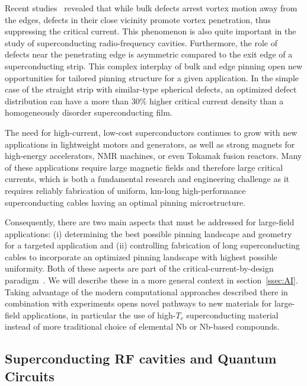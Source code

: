 \documentclass[%
 aip,
 amsmath,amssymb,
 reprint,%
floatfix]{revtex4-1}
\newcommand{\Tc}{T_{c}}
\begin{document}
Recent studies~\cite{kimmel2019} revealed that while bulk defects arrest vortex motion away from the edges, defects in their close vicinity promote vortex penetration, thus suppressing the critical current. This phenomenon is also quite important in the study of superconducting radio-frequency cavities. Furthermore, the role of defects near the penetrating edge is asymmetric compared to the exit edge of a superconducting strip. This complex interplay of bulk and edge pinning open new opportunities for tailored pinning structure for a given application.
In the simple case of the straight strip with similar-type spherical defects, an optimized defect distribution can have a more than 30\% higher critical current density than a homogeneously disorder superconducting film.

The need for high-current, low-cost superconductors continues to grow with new applications in lightweight motors and generators, as well as strong magnets for high-energy accelerators, NMR machines, or even Tokamak fusion reactors. Many of these applications require large magnetic fields and therefore large critical currents, which is both a fundamental research and engineering challenge as it requires reliably fabrication of uniform, km-long high-performance superconducting cables having an optimal pinning microstructure.


Consequently, there are two main aspects that must be addressed for large-field applications:
(i) determining the best possible pinning landscape and geometry for a targeted application and
(ii) controlling fabrication of long superconducting cables to incorporate an optimized pinning landscape with highest possible uniformity. Both of these aspects are part of the critical-current-by-design paradigm~\cite{ROPP}. We will describe these in a more general context in section~\ref{ssec:AI}. Taking advantage of the modern computational approaches described there in combination with experiments opens novel pathways to new materials for large-field applications, in particular the use of high-$\Tc$ superconducting material instead of more traditional choice of elemental Nb or Nb-based compounds.


\subsection{Superconducting RF cavities and Quantum Circuits}
\label{sec:RFcavities}
\end{document}
